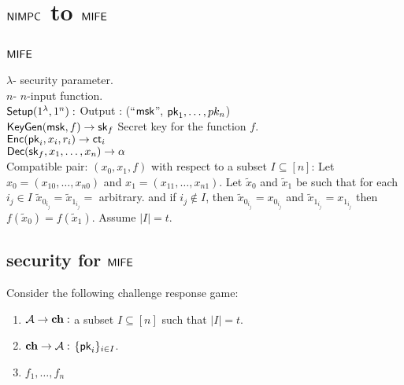 \section{$\mathsf{NIMPC}$ to $\mathsf{MIFE}$}
\subsection{$\mathsf{MIFE}$}
$\lambda$- security parameter.\\
$n$- $n$-input function.\\
$\mathsf{Setup}(1^{\lambda},1^n):$ Output : (``$\mathsf{msk}$'', $\mathsf{pk}_1, \ldots ,pk_n$)\\
$\mathsf{KeyGen}(\mathsf{msk}, f) \rightarrow \mathsf{sk}_f$ Secret key for the function $f$.\\
$\mathsf{Enc}(\mathsf{pk}_i, x_i, r_i)\rightarrow \mathsf{ct}_i$\\
$\mathsf{Dec}(\mathsf{sk}_f,x_1,\ldots, x_n)\rightarrow \alpha$\\ 
Compatible pair: $(x_0,x_1,f)$ with respect to a subset $I\subseteq [n]$: Let $x_0=(x_{10},\ldots, x_{n0})$ and $x_1=(x_{11},\ldots, x_{n1})$. Let $\tilde{x}_0$ and $\tilde{x}_1$ be such that for each $i_j\in I$ $\tilde{x}_{0_{i_j}}=\tilde{x}_{1_{i_j}}=$ arbitrary. and if $i_j\notin I$, then $\tilde{x}_{0_{i_j}}=x_{0_{i_j}}$ and $\tilde{x}_{1_{i_j}}=x_{1_{i_j}}$ then $f(\tilde{x}_0)=f(\tilde{x}_1)$. Assume $|I|=t$.

\subsection{security for $\mathsf{MIFE}$}
Consider the following challenge response game:
\begin{enumerate}
	\item $\mathcal{A} \rightarrow \mathbf{ch}:$ a subset $I\subseteq[n]$ such that $|I|= t$.
	\item $\mathbf{ch} \rightarrow \mathcal{A}:$ $\{\mathsf{pk}_i\}_{i\in I}$.
	\item $f_1,\ldots,f_n$
\end{enumerate}
